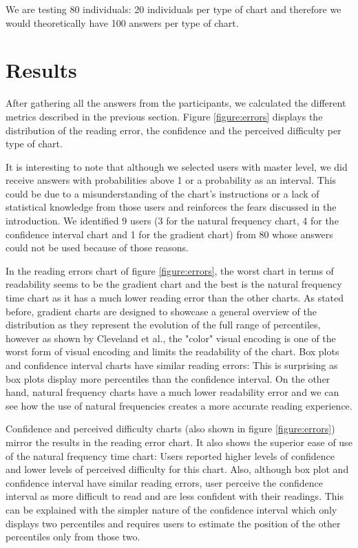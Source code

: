 \documentclass[a4paper,3p,sort&compress]{elsarticle}
\begin{document}
We are testing 80 individuals: 20 individuals per type of chart and therefore we would theoretically have 100 answers per 
type of chart.

\section{Results}
\label{sec:results}


After gathering all the answers from the participants, we calculated the different metrics described in the previous section.
 Figure \ref{figure:errors} displays 
the distribution of the reading error, the confidence and the perceived difficulty per type of chart. 

It is interesting to note that although we selected users with master level, we did receive answers with probabilities 
above 1 or a probability as an interval. This could be due to a misunderstanding of the chart's instructions or 
a lack of statistical knowledge from those 
users and reinforces the fears discussed in the introduction. We identified 9 users (3 for the natural frequency chart, 
4 for the confidence interval chart and 1 for the gradient chart)
 from 80 whose answers could not be used because of those reasons.

In the reading errors chart of figure \ref{figure:errors}, the worst chart in terms of readability seems to be the 
gradient chart and the best is the natural frequency time chart as it has a much lower reading error than the other charts. As stated before, 
gradient charts are designed to showcase a general overview of the distribution as they represent the evolution of the
full range of percentiles, however as shown by Cleveland et al., the "color" visual encoding is one of the 
worst form of visual encoding and limits the readability of the chart. Box plots and confidence interval charts have similar reading errors: This is surprising
as box plots display more percentiles than the confidence interval. On the other hand, natural 
frequency charts have a much lower readability error and we can see how the use of natural frequencies creates a more accurate reading experience.

Confidence and perceived difficulty charts (also shown in figure \ref{figure:errors}) mirror the results in the reading error chart.
It also shows the superior ease of use 
of the natural frequency time chart: Users reported higher levels of confidence and 
lower levels of perceived difficulty for this chart. Also, although box plot and confidence interval have similar reading errors,
user perceive the confidence interval as more difficult to read and are less confident with their readings. This can be explained with 
the simpler nature of the confidence interval which only displays two percentiles and requires users to estimate the position of the other 
percentiles only from those two.
\end{document}
